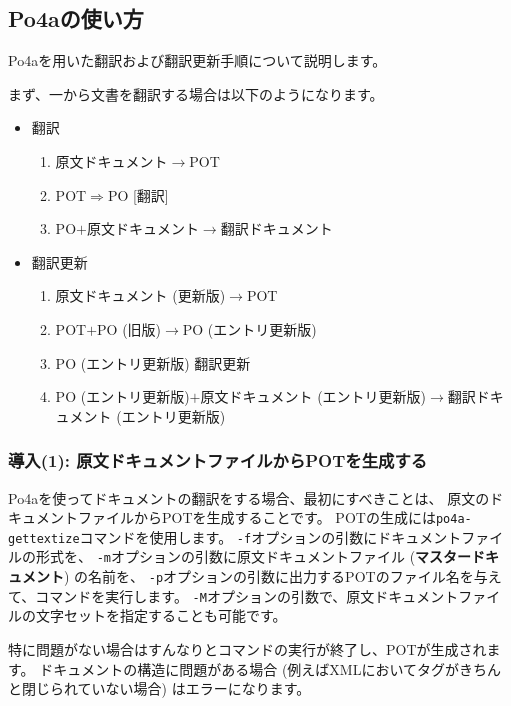 \documentclass[mingoth,a4paper]{jsarticle}
\begin{document}
\subsection{Po4aの使い方}

Po4aを用いた翻訳および翻訳更新手順について説明します。

まず、一から文書を翻訳する場合は以下のようになります。

\begin{itemize}
 \item 翻訳
       \begin{enumerate}
	\item 原文ドキュメント$\rightarrow$POT
	\item POT$\Rightarrow$PO [翻訳]
	\item PO$+$原文ドキュメント$\rightarrow$翻訳ドキュメント
       \end{enumerate}
 \item 翻訳更新
       \begin{enumerate}
	\item 原文ドキュメント (更新版)$\rightarrow$POT
	\item POT$+$PO (旧版)$\rightarrow$PO (エントリ更新版)
	\item PO (エントリ更新版) 翻訳更新
	\item PO (エントリ更新版)$+$原文ドキュメント (エントリ更新版)$\rightarrow$翻訳ドキュメント (エントリ更新版)
       \end{enumerate}
\end{itemize}

\subsubsection{導入(1): 原文ドキュメントファイルからPOTを生成する}

Po4aを使ってドキュメントの翻訳をする場合、最初にすべきことは、
原文のドキュメントファイルからPOTを生成することです。
POTの生成には\texttt{po4a-gettextize}コマンドを使用します。
\texttt{-f}オプションの引数にドキュメントファイルの形式を、
\texttt{-m}オプションの引数に原文ドキュメントファイル ({\bf マスタードキュメント}) の名前を、
\texttt{-p}オプションの引数に出力するPOTのファイル名を与えて、コマンドを実行します。
\texttt{-M}オプションの引数で、原文ドキュメントファイルの文字セットを指定することも可能です。

特に問題がない場合はすんなりとコマンドの実行が終了し、POTが生成されます。
ドキュメントの構造に問題がある場合 (例えばXMLにおいてタグがきちんと閉じられていない場合) はエラーになります。
\end{document}
